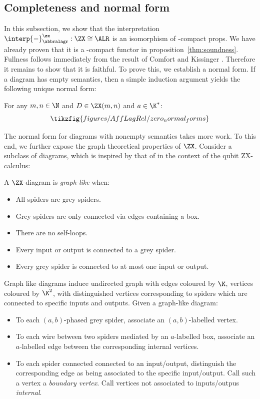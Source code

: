 \subsection{Completeness and normal form}
\label{ssec:completeness}
In this subsection, we show that the interpretation  \(\interp{-}^\zx_\abbralagr:\ZX \cong \ALR\)  is an isomorphism of \dag-compact props.  We have already proven that it is a \dag-compact functor in proposition~\ref{thm:soundness}.  Fullness follows immediately from the result of Comfort and Kissinger  \cite[Lemma 4.6]{comfort_graphical_2021}.
Therefore it remains to show that it is faithful.  To prove this, we establish a normal form.
If a diagram  has empty semantics, then a simple induction argument yields the following unique normal form:
\begin{proposition}
  \label{prop:zero_normal_forms}
  For any \(m,n \in \N\) and \(D \in \ZX(m,n)\) and \(a \in \K^*\): 
  \begin{equation*}
    \tikzfig{figures/AffLagRel/zero_normal_forms}
  \end{equation*}
\end{proposition}
The normal form for diagrams with nonempty semantics takes more work.
To this end, we further expose the graph theoretical properties of \(\ZX\).
Consider a subclass of diagrams, which is inspired by that of \textcite{duncan_graph-theoretic_2020} in the context of the qubit ZX-calculus:
\begin{definition}
  A \(\ZX\)-diagram is \emph{graph-like} when:
  \begin{itemize}
    \item All spiders are grey spiders.
    \item Grey spiders are only connected via edges containing a box.
    \item There are no self-loops.
    \item Every input or output is connected to a grey spider.
    \item Every grey spider is connected to at most one input or output.
  \end{itemize}
Graph like diagrams induce undirected graph with edges coloured by \(\K\),  vertices coloured by \(\K^2\), with distinguished vertices corresponding to spiders which are connected to specific inputs and outputs.  Given a graph-like diagram:
\begin{itemize}
  \item To each \((a,b)\)-phased grey spider, associate an \((a,b)\)-labelled vertex.
  \item To each wire between two spiders mediated by an \(a\)-labelled box, associate an \(a\)-labelled edge between the corresponding internal vertices.
  \item To each spider connected connected to an input/output, distinguish the corresponding edge as being associated to the specific input/output.  Call such a vertex a {\em boundary vertex}.  Call vertices not associated to inputs/outpus {\em internal}.
\end{itemize}
\end{definition}
